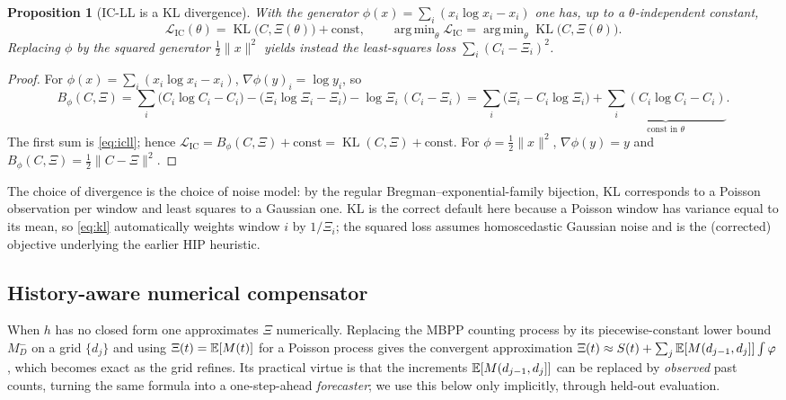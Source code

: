 \documentclass[11pt]{article}
\theoremstyle{plain}
\newtheorem{proposition}[theorem]{Proposition}
\theoremstyle{definition}
\theoremstyle{remark}
\DeclareMathOperator{\KL}{KL}\DeclareMathOperator*{\argmin}{arg\,min}
\begin{document}
\begin{proposition}[IC-LL is a KL divergence]
\label{prop:bregman}
With the generator $\phi(x)=\sum_i(x_i\log x_i-x_i)$ one has, up to a
$\theta$-independent constant,
\begin{equation}
\mathcal L_{\mathrm{IC}}(\theta)=\KL\big(C,\Xi(\theta)\big)+\mathrm{const},
\qquad
\argmin_\theta\mathcal L_{\mathrm{IC}}=\argmin_\theta\KL\big(C,\Xi(\theta)\big).
\label{eq:kl}
\end{equation}
Replacing $\phi$ by the squared generator $\tfrac12\|x\|^2$ yields instead the
least-squares loss $\sum_i(C_i-\Xi_i)^2$.
\end{proposition}
\begin{proof}
For $\phi(x)=\sum_i(x_i\log x_i-x_i)$, $\nabla\phi(y)_i=\log y_i$, so
\[
B_\phi(C,\Xi)=\sum_i\big(C_i\log C_i-C_i\big)-\big(\Xi_i\log\Xi_i-\Xi_i\big)-\log\Xi_i\,(C_i-\Xi_i)
=\sum_i\big(\Xi_i-C_i\log\Xi_i\big)+\underbrace{\sum_i(C_i\log C_i-C_i)}_{\text{const in }\theta}.
\]
The first sum is \eqref{eq:icll}; hence $\mathcal L_{\mathrm{IC}}=B_\phi(C,\Xi)+\mathrm{const}=\KL(C,\Xi)+\mathrm{const}$.
For $\phi=\tfrac12\|x\|^2$, $\nabla\phi(y)=y$ and $B_\phi(C,\Xi)=\tfrac12\|C-\Xi\|^2$.
\end{proof}

The choice of divergence is the choice of noise model: by the regular
Bregman--exponential-family bijection, KL corresponds to a Poisson observation per
window and least squares to a Gaussian one. KL is the correct default here because
a Poisson window has variance equal to its mean, so \eqref{eq:kl} automatically
weights window $i$ by $1/\Xi_i$; the squared loss assumes homoscedastic Gaussian
noise and is the (corrected) objective underlying the earlier HIP heuristic.

\subsection{History-aware numerical compensator}

When $h$ has no closed form one approximates $\Xi$ numerically. Replacing the
MBPP counting process by its piecewise-constant lower bound $M_D^-$ on a grid
$\{d_j\}$ and using $\Xi(t)=\mathbb{E}[M(t)]$ for a Poisson process gives the convergent
approximation $\Xi(t)\approx S(t)+\sum_j\mathbb{E}[M(d_{j-1},d_j]]\int\varphi$, which
becomes exact as the grid refines. Its practical virtue is that the increments
$\mathbb{E}[M(d_{j-1},d_j]]$ can be replaced by \emph{observed} past counts, turning the
same formula into a one-step-ahead \emph{forecaster}; we use this below only
implicitly, through held-out evaluation.
\end{document}
